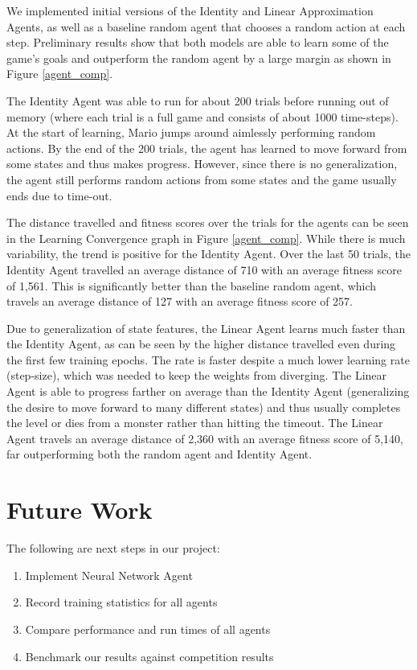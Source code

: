 \documentclass[12pt]{article}
\begin{document}
We implemented initial versions of the Identity and Linear Approximation Agents, as well as a baseline random agent that chooses a random action at each step. Preliminary results show that both models are able to learn some of the game's goals and outperform the random agent by a large margin as shown in Figure \ref{agent_comp}.

The Identity Agent was able to run for about 200 trials before running out of memory (where each trial is a full game and consists of about 1000 time-steps). At the start of learning, Mario jumps around aimlessly performing random actions. By the end of the 200 trials, the agent has learned to move forward from some states and thus makes progress. However, since there is no generalization, the agent still performs random actions from some states and the game usually ends due to time-out. 

The distance travelled and fitness scores over the trials for the agents can be seen in the Learning Convergence graph in Figure \ref{agent_comp}. While there is much variability, the trend is positive for the Identity Agent. Over the last 50 trials, the Identity Agent travelled an average distance of 710 with an average fitness score of 1,561. This is significantly better than the baseline random agent, which travels an average distance of 127 with an average fitness score of 257.

Due to generalization of state features, the Linear Agent learns much faster than the Identity Agent, as can be seen by the higher distance travelled even during the first few training epochs. The rate is faster despite a much lower learning rate (step-size), which was needed to keep the weights from diverging. The Linear Agent is able to progress farther on average than the Identity Agent (generalizing the desire to move forward to many different states) and thus usually completes the level or dies from a monster rather than hitting the timeout. The Linear Agent travels an average distance of 2,360 with an average fitness score of 5,140, far outperforming both the random agent and Identity Agent.

\section{Future Work}

The following are next steps in our project:

\begin{enumerate}
\item Implement Neural Network Agent
\item Record training statistics for all agents
\item Compare performance and run times of all agents
\item Benchmark our results against competition results
\end{enumerate}
\end{document}
